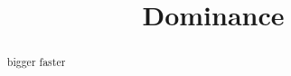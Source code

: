 \documentclass{ximera}
\title{Dominance}
\begin{document}
\begin{abstract}
bigger faster
\end{abstract}
\maketitle
\end{document}
